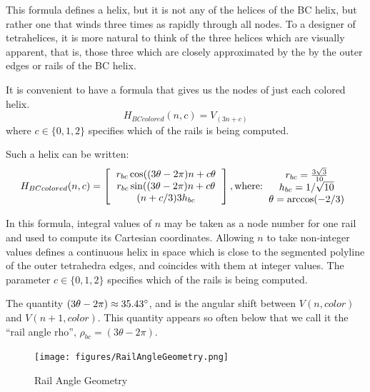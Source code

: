 \documentclass[11pt]{article}
\begin{document}
This formula defines a helix, but it is not any of the helices of the BC helix, but rather one that winds three times
as rapidly through all nodes. To a designer of tetrahelices, it is more natural to think of the three helices which
are visually apparent, that is, those three which are closely approximated by the by the outer edges or rails of the BC helix.

It is convenient to have a formula that gives us the nodes of just
each colored helix.
\[
H_{BCcolored}(n,c) = V_(3n +c)
\]
where $c \in \{0,1,2\}$ specifies which of the rails is being computed.

Such a helix can be written:
\[
H_{BCcolored}(n,c) =
\left [
  \begin{tabular}{c}
   $ r_{bc}  \cos((3 \theta - 2 \pi)n + c  \theta $\\
   $ r_{bc} \sin((3 \theta - 2 \pi)n + c  \theta $\\
   $ (n + c/3) 3  h_{bc} $
  \end{tabular}
  \right ],
\text{where:}
  \begin{tabular}{c}
 $ r_{bc} = \frac{3\sqrt{3}}{10} $\\
 $ h_{bc} = 1/\sqrt{10} $ \\
 $ \theta = \arccos(-2/3) $ \\
  \end{tabular}      
  \]

In this formula, integral values of $n$ may be taken as a node number for one rail and used to compute its Cartesian
coordinates. Allowing $n$ to take non-integer values defines a continuous
helix in space which is close to the segmented polyline of the outer tetrahedra edges, and coincides with them at integer
values.
The parameter $c \in \{0,1,2\}$ specifies which of the rails is being computed.

The quantity $ (3 \theta - 2 \pi) \approx 35.43 \degree $, and is the angular shift between $V(n,color)$ and
$V(n+1,color)$. This quantity appears so often below that we call it the ``rail angle rho'', $\rho_{bc} = (3 \theta - 2 \pi)$.

\begin{figure}[H]
  \label{railanglefig}
     \centering
     \texttt{[image: figures/RailAngleGeometry.png]}
     \caption{Rail Angle Geometry}
 \end{figure}
\end{document}
